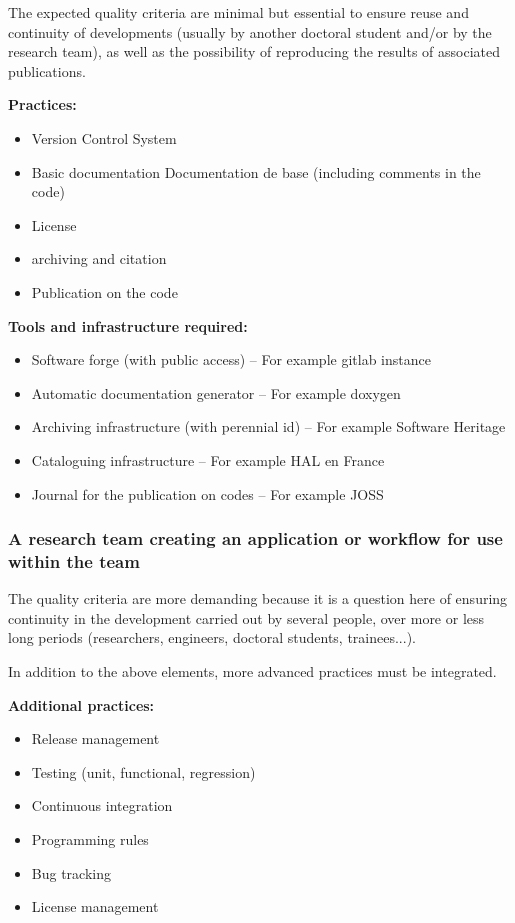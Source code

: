 The expected quality criteria are minimal but essential to ensure
reuse and continuity of developments (usually by another doctoral
student and/or by the research team), as well as the possibility of
reproducing the results of associated publications. 

{\bf Practices:}
\begin{itemize}
\item Version Control System
\item Basic documentation Documentation de base (including comments in the code)
\item License 
\item archiving and citation
\item Publication on the code
\end{itemize}

{\bf Tools and infrastructure required:}
\begin{itemize}
\item Software forge (with public access) – For example gitlab instance
\item Automatic documentation generator – For example doxygen
\item Archiving infrastructure (with perennial id) – For example Software Heritage
\item Cataloguing infrastructure – For example HAL en France
\item Journal for the publication on codes – For example JOSS
\end{itemize}


\subsubsection{A research team creating an application or workflow for
use within the team}

The quality criteria are more demanding because it is a question here
of ensuring continuity in the development carried out by several
people, over more or less long periods (researchers, engineers,
doctoral students, trainees...).

In addition to the above elements, more advanced practices must be
integrated.

{\bf Additional practices:}
\begin{itemize}
\item Release management
\item Testing (unit, functional, regression)
\item Continuous integration
\item Programming rules
\item Bug tracking
\item License management
\end{itemize}

